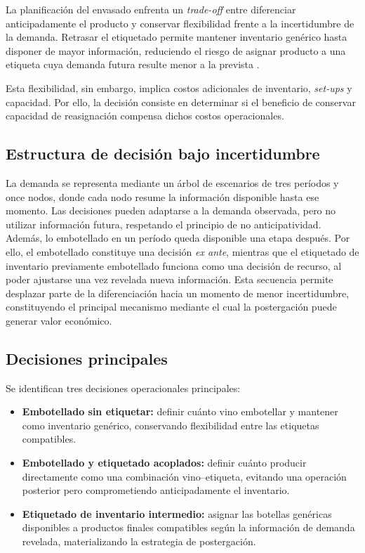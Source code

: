 \label{subsec:decisiones_objetivos_restricciones}
La planificación del envasado enfrenta un \textit{trade-off} entre diferenciar anticipadamente el producto y conservar flexibilidad frente a la incertidumbre de la demanda. Retrasar el etiquetado permite mantener inventario genérico hasta disponer de mayor información, reduciendo el riesgo de asignar producto a una
etiqueta cuya demanda futura resulte menor a la prevista
\citep{cholette2009,varas2018}.

Esta flexibilidad, sin embargo, implica costos adicionales de inventario, \textit{set-ups} y capacidad. Por ello, la decisión consiste en determinar si el beneficio de conservar capacidad de reasignación compensa dichos costos operacionales.

\subsection{Estructura de decisión bajo incertidumbre}

La demanda se representa mediante un árbol de escenarios de tres períodos y once nodos, donde cada nodo resume la información disponible hasta ese momento. Las decisiones pueden adaptarse a la demanda observada, pero no utilizar información futura, respetando el principio de no anticipatividad. Además, lo embotellado en un período queda disponible una etapa después. Por ello, el embotellado constituye una decisión \textit{ex ante}, mientras que el etiquetado de inventario previamente embotellado funciona como una decisión de recurso, al poder ajustarse una vez revelada nueva información. Esta secuencia permite desplazar parte de la diferenciación hacia un momento de menor incertidumbre, constituyendo el principal mecanismo mediante el cual la postergación puede generar valor económico.

\subsection{Decisiones principales}

Se identifican tres decisiones operacionales principales:

\begin{itemize}
    \item \textbf{Embotellado sin etiquetar:} definir cuánto vino embotellar y mantener como inventario genérico, conservando flexibilidad entre las etiquetas compatibles.

    \item \textbf{Embotellado y etiquetado acoplados:} definir cuánto producir directamente como una combinación vino--etiqueta, evitando una operación posterior pero comprometiendo anticipadamente el inventario.

    \item \textbf{Etiquetado de inventario intermedio:} asignar las botellas genéricas disponibles a productos finales compatibles según la información de demanda revelada, materializando la estrategia de postergación.
\end{itemize}

